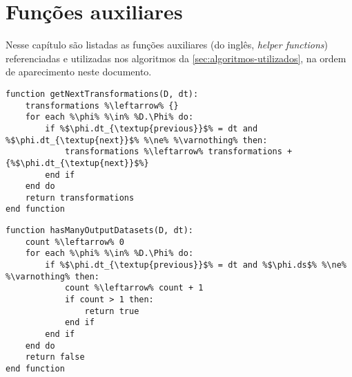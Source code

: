
\chapter{Funções auxiliares}%
\label{app:funcoes-auxiliares}

Nesse capítulo são listadas as funções auxiliares (do inglês, \textit{helper functions}) referenciadas e utilizadas nos algoritmos da \autoref{sec:algoritmos-utilizados}, na ordem de aparecimento neste documento.

\vfill{}

\begin{minipage}[c]{0.95\textwidth}
\begin{lstlisting}[language=pseudocode,label={lst:get-next-transformations},caption={[Obtenção das próximas transformações de dados de uma transformação]Obtenção das próximas transformações de dados de uma transformação de dados.}]
function getNextTransformations(D, dt):
    transformations %\leftarrow% {}
    for each %\phi% %\in% %D.\Phi% do:
        if %$\phi.dt_{\textup{previous}}$% = dt and %$\phi.dt_{\textup{next}}$% %\ne% %\varnothing% then:
            transformations %\leftarrow% transformations + {%$\phi.dt_{\textup{next}}$%}
        end if
    end do
    return transformations
end function
\end{lstlisting}
\end{minipage}

\vfill{}

\begin{minipage}[c]{0.95\textwidth} \begin{lstlisting}[language=pseudocode,label={lst:has-many-output-datasets},caption={[Contagem dos conjuntos de dados de saída de uma transformação]Contagem dos conjuntos de dados de saída de uma transformação de dados. Retorna verdadeiro caso essa quantidade seja maior do que um, e falso caso contrário.}]
function hasManyOutputDatasets(D, dt):
    count %\leftarrow% 0
    for each %\phi% %\in% %D.\Phi% do:
        if %$\phi.dt_{\textup{previous}}$% = dt and %$\phi.ds$% %\ne% %\varnothing% then:
            count %\leftarrow% count + 1
            if count > 1 then:
                return true
            end if
        end if
    end do
    return false
end function
\end{lstlisting}
\end{minipage}

\vfill{}

